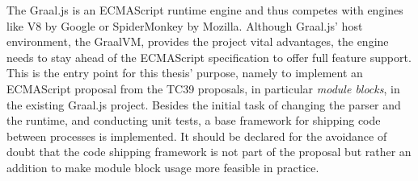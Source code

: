 The Graal.js is an ECMAScript runtime engine and thus competes with engines like V8 by Google or SpiderMonkey by Mozilla. Although Graal.js' host environment, the GraalVM, provides the project vital advantages, the engine needs to stay ahead of the ECMAScript specification to offer full feature support. This is the entry point for this thesis' purpose, namely to implement an ECMAScript proposal from the TC39 proposals, in particular \emph{module blocks}, in the existing Graal.js project. Besides the initial task of changing the parser and the runtime, and conducting unit tests, a base framework for shipping code between processes is implemented.  It should be declared for the avoidance of doubt that the code shipping framework is not part of the proposal but rather an addition to make module block usage more feasible in practice.

